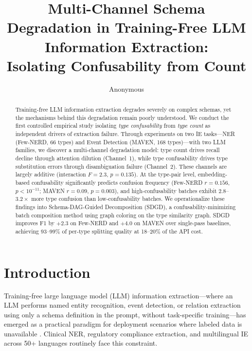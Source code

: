 \documentclass[11pt,a4paper]{article}
\title{Multi-Channel Schema Degradation in Training-Free LLM Information Extraction:\\ Isolating Confusability from Count}
\author{Anonymous}
\date{}
\begin{document}
\maketitle

\begin{abstract}
Training-free LLM information extraction degrades severely on complex schemas, yet the mechanisms behind this degradation remain poorly understood. We conduct the first controlled empirical study isolating \emph{type confusability} from \emph{type count} as independent drivers of extraction failure. Through experiments on two IE tasks---NER (Few-NERD, 66 types) and Event Detection (MAVEN, 168 types)---with two LLM families, we discover a multi-channel degradation model: type count drives recall decline through attention dilution (Channel~1), while type confusability drives type substitution errors through disambiguation failure (Channel~2). These channels are largely additive (interaction $F=2.3$, $p=0.135$). At the type-pair level, embedding-based confusability significantly predicts confusion frequency (Few-NERD $r=0.156$, $p<10^{-11}$; MAVEN $r=0.09$, $p=0.003$), and high-confusability batches exhibit $2.8$--$3.2\times$ more type confusion than low-confusability batches. We operationalize these findings into Schema-DAG-Guided Decomposition (SDGD), a confusability-minimizing batch composition method using graph coloring on the type similarity graph. SDGD improves F1 by $+2.3$ on Few-NERD and $+4.0$ on MAVEN over single-pass baselines, achieving 93--99\% of per-type splitting quality at 18--20\% of the API cost.
\end{abstract}

\section{Introduction}
\label{sec:intro}

Training-free large language model (LLM) information extraction---where an LLM performs named entity recognition, event detection, or relation extraction using only a schema definition in the prompt, without task-specific training---has emerged as a practical paradigm for deployment scenarios where labeled data is unavailable \cite{li2023evaluating,wang2023gptner}. Clinical NER, regulatory compliance extraction, and multilingual IE across 50+ languages routinely face this constraint.
\end{document}
